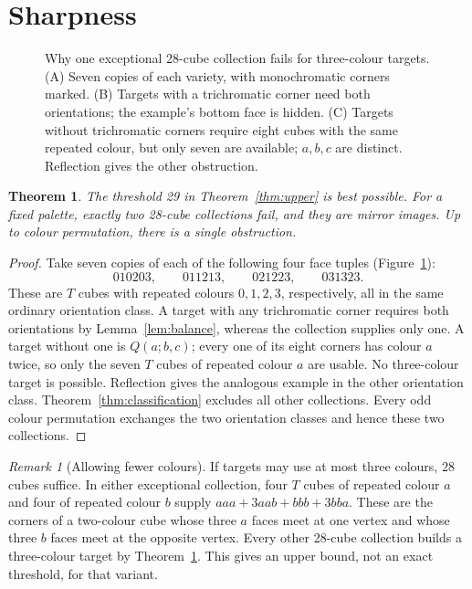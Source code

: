 \documentclass[11pt]{article}
\newtheorem{theorem}{Theorem}
\theoremstyle{remark}
\newtheorem*{remark}{Remark}
\begin{document}
\section{Sharpness}
\begin{figure}[ht]
\centering

\caption{Why one exceptional 28-cube collection fails for three-colour targets. (A) Seven copies of each
variety, with monochromatic corners marked. (B) Targets with a trichromatic
corner need both orientations; the example's bottom face is hidden. (C) Targets without
trichromatic corners require eight cubes with the same repeated colour,
but only seven are available; $a,b,c$ are distinct. Reflection gives the
other obstruction.}
\label{fig:obstruction}
\end{figure}
\begin{theorem}\label{thm:sharp}
The threshold 29 in Theorem~\ref{thm:upper} is best possible. For a fixed
palette, exactly two 28-cube collections fail, and they are mirror images.
Up to colour permutation, there is a single obstruction.
\end{theorem}
\begin{proof}
Take seven copies of each of the following four face tuples
(Figure~\ref{fig:obstruction}):
\[
 010203,\qquad 011213,\qquad 021223,\qquad 031323.
\]
These are $T$ cubes with repeated colours $0,1,2,3$, respectively, all in
the same ordinary orientation class. A target with any trichromatic corner
requires both orientations by Lemma~\ref{lem:balance}, whereas the
collection supplies only one. A target without one is $Q(a;b,c)$;
every one of its eight corners has colour $a$ twice, so only the seven
$T$ cubes of repeated colour $a$ are usable. No three-colour target is
possible. Reflection gives the analogous example in the other orientation
class. Theorem~\ref{thm:classification} excludes all other collections.
Every odd colour permutation exchanges the two orientation classes and
hence these two collections.
\end{proof}

\begin{remark}[Allowing fewer colours]
If targets may use at most three colours, 28 cubes suffice. In either
exceptional collection, four $T$ cubes of repeated colour $a$ and four of
repeated colour $b$ supply $aaa+3aab+bbb+3bba$. These are the corners of a
two-colour cube whose three $a$ faces meet at one vertex and whose three $b$
faces meet at the opposite vertex. Every other 28-cube collection builds
a three-colour target by Theorem~\ref{thm:sharp}. This gives an upper bound,
not an exact threshold, for that variant.
\end{remark}
\end{document}
